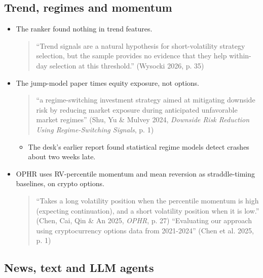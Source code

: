 \documentclass{article}
\begin{document}
\subsection{Trend, regimes and momentum}

\begin{itemize}

\item The ranker found nothing in trend features.

\begin{quote}``Trend signals are a natural hypothesis for short-volatility strategy selection, but the sample provides no evidence that they help within-day selection at this threshold.'' (Wysocki 2026, p. 35)\end{quote}

\item The jump-model paper times equity exposure, not options.

\begin{quote}``a regime-switching investment strategy aimed at mitigating downside risk by reducing market exposure during anticipated unfavorable market regimes'' (Shu, Yu \& Mulvey 2024, \emph{Downside Risk Reduction Using Regime-Switching Signals}, p. 1)\end{quote}

\begin{itemize}

\item The desk's earlier report found statistical regime models detect crashes about two weeks late.

\end{itemize}

\item OPHR uses RV-percentile momentum and mean reversion as straddle-timing baselines, on crypto options.

\begin{quote}``Takes a long volatility position when the percentile momentum is high (expecting continuation), and a short volatility position when it is low.'' (Chen, Cai, Qin \& An 2025, \emph{OPHR}, p. 27) ``Evaluating our approach using cryptocurrency options data from 2021-2024'' (Chen et al. 2025, p. 1)\end{quote}

\end{itemize}

\subsection{News, text and LLM agents}
\end{document}
